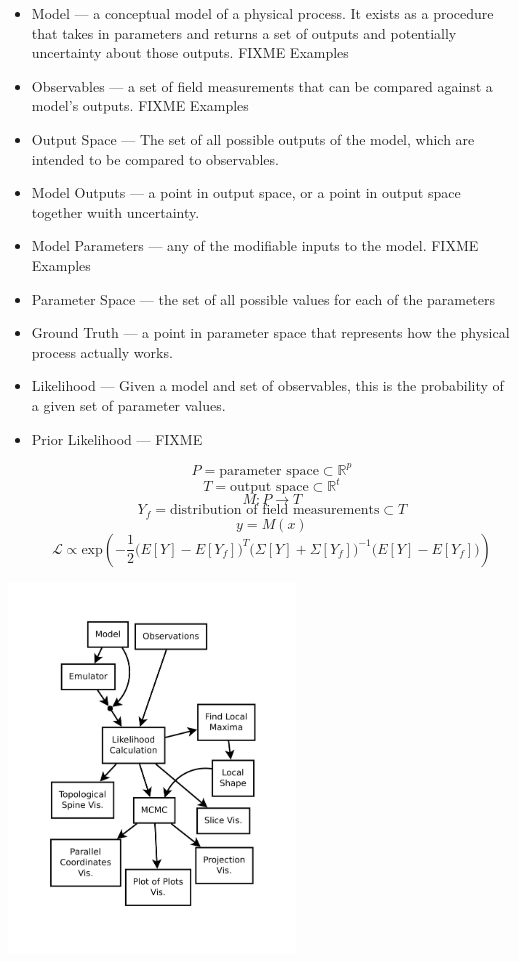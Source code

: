 \documentclass{article}
\begin{document}
\begin{itemize}

\item Model — a conceptual model of a physical process.  It exists as
  a procedure that takes in parameters and returns a set of
  outputs and potentially uncertainty about those outputs. FIXME Examples
 
\item Observables — a set of field measurements that can be compared
  against a model's outputs. FIXME Examples

\item Output Space — The set of all possible outputs of the model,
  which are intended to be compared to observables.

\item Model Outputs — a point in output space, or a point in output
  space together wuith uncertainty.

\item Model Parameters — any of the modifiable inputs to the
  model. FIXME Examples

\item Parameter Space — the set of all possible values for each of the
  parameters

\item Ground Truth — a point in parameter space that represents how
  the physical process actually works.

\item Likelihood — Given a model and set of observables, this is the
  probability of a given set of parameter values.

\item Prior Likelihood — FIXME

\newpage

\[ P = \textrm{parameter space} ⊂ ℝ^p \]
\[ T = \textrm{output space} ⊂ ℝ^t \]
\[ M: P → T \]
\[ Y_f = \textrm{distribution of field measurements} ⊂ T\]
\[ y = M(x) \]
\[
ℒ ∝ \textrm{exp}\left({-\frac{1}{2}\big(E[Y]-E[Y_f]\big)^T \big(Σ[Y]+Σ[Y_f]\big)^{-1} \big(E[Y]-E[Y_f]\big)}\right)
\]

\end{itemize}

\begin{center}
\includegraphics[width=3in]{figures/MADAI_Stats_and_Vis.pdf}
\end{center}
\end{document}
